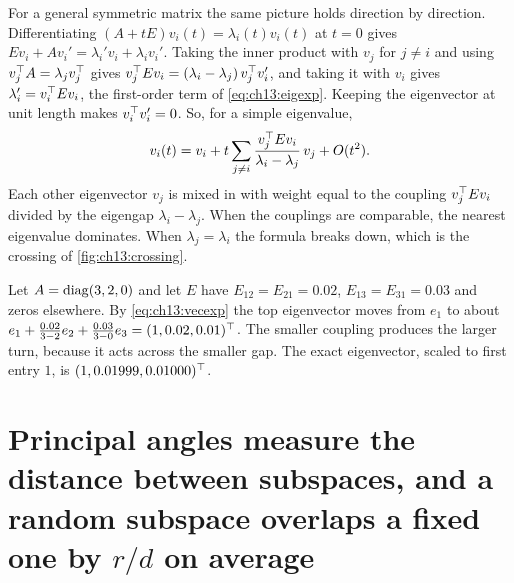 For a general symmetric matrix the same picture holds direction by direction.
Differentiating $(A+tE)v_i(t)=\lambda_i(t)v_i(t)$ at $t=0$ gives
$Ev_i+Av_i'=\lambda_i'v_i+\lambda_iv_i'$. Taking the inner product with $v_j$ for
$j\ne i$ and using $v_j^{\top} A=\lambda_jv_j^{\top}$ gives
$v_j^{\top} Ev_i=(\lambda_i-\lambda_j)\,v_j^{\top} v_i'$, and taking it with $v_i$ gives
$\lambda_i'=v_i^{\top} Ev_i$, the first-order term of \cref{eq:ch13:eigexp}. Keeping the
eigenvector at unit length makes $v_i^{\top} v_i'=0$. So, for a simple eigenvalue,
\begin{equation}\label{eq:ch13:vecexp}
v_i(t)=v_i+t\sum_{j\ne i}\frac{v_j^{\top} Ev_i}{\lambda_i-\lambda_j}\,v_j+O(t^2).
\end{equation}
Each other eigenvector $v_j$ is mixed in with weight equal to the coupling
$v_j^{\top} Ev_i$ divided by the eigengap $\lambda_i-\lambda_j$. When the couplings
are comparable, the nearest eigenvalue dominates. When $\lambda_j=\lambda_i$ the formula breaks down, which is
the crossing of \cref{fig:ch13:crossing}.

\begin{example}\label{ex:ch13:vecexp}
Let $A=\operatorname{diag}(3,2,0)$ and let $E$ have $E_{12}=E_{21}=0.02$, $E_{13}=E_{31}=0.03$
and zeros elsewhere. By \cref{eq:ch13:vecexp} the top eigenvector moves from $e_1$
to about $e_1+\tfrac{0.02}{3-2}e_2+\tfrac{0.03}{3-0}e_3=(1,0.02,0.01)^{\top}$. The
smaller coupling produces the larger turn, because it acts across the smaller
gap. The exact eigenvector, scaled to first entry $1$, is
$(1,0.01999,0.01000)^{\top}$.
\end{example}



\section{Principal angles measure the distance between subspaces, and a random subspace overlaps a fixed one by $r/d$ on average}\label{sec:ch13:angles}

